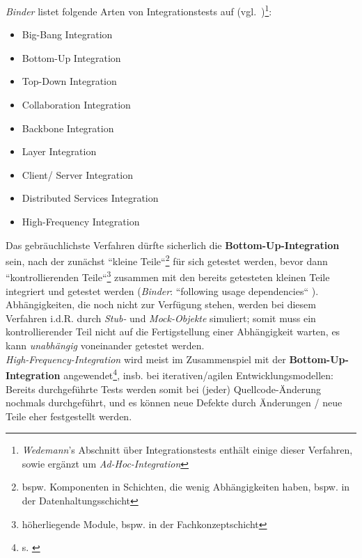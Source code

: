 



\textit{Binder} listet folgende Arten von Integrationstests auf (vgl.~\cite[642]{Bin99})\footnote{
    \textit{Wedemann}'s Abschnitt über Integrationstests \cite[59]{Wed09c} enthält einige dieser Verfahren, sowie ergänzt um \textit{Ad-Hoc-Integration}
}:

\begin{itemize}
    \item Big-Bang Integration
    \item Bottom-Up Integration
    \item Top-Down Integration
    \item Collaboration Integration
    \item Backbone Integration
    \item Layer Integration
    \item Client/ Server Integration
    \item Distributed Services Integration
    \item High-Frequency Integration
\end{itemize}


\noindent
Das gebräuchlichste Verfahren dürfte sicherlich die \textbf{Bottom-Up-Integration} sein, nach der zunächst ``kleine Teile``\footnote{
bspw. Komponenten in Schichten, die wenig Abhängigkeiten haben, bspw. in der Datenhaltungsschicht
} für sich getestet werden, bevor dann ``kontrollierenden Teile``\footnote{
höherliegende Module, bspw. in der Fachkonzeptschicht
}  zusammen mit den bereits getesteten kleinen Teile integriert und getestet werden (\textit{Binder}: ``following usage dependencies`` \cite[642]{Bin99}). Abhängigkeiten, die noch nicht zur Verfügung stehen, werden bei diesem Verfahren i.d.R. durch \textit{Stub-} und \textit{Mock-Objekte} simuliert; somit muss ein kontrollierender Teil nicht auf die Fertigstellung einer Abhängigkeit warten, es kann \textit{unabhängig} voneinander getestet werden.\\
\textit{High-Frequency-Integration} wird meist im Zusammenspiel mit der \textbf{Bottom-Up-Integration} angewendet\footnote{
s. \cite[60]{Wed09c}
}, insb. bei iterativen/agilen Entwicklungsmodellen: Bereits durchgeführte Tests werden somit bei (jeder) Quellcode-Änderung nochmals durchgeführt, und es können neue Defekte durch Änderungen / neue Teile eher festgestellt werden.